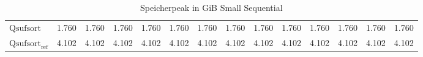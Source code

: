 \begin{table}[h]
{\begin{tabular}{lrrrrrrrrrrrrr}
    $\text{Qsufsort}$ & 1.760 & 1.760 & 1.760 & 1.760 & 1.760 & 1.760 & 1.760 & 1.760 & 1.760 & 1.760 & 1.760 & 1.760 & 1.760 \\
    $\text{Qsufsort}_{\text{ref}}$ & 4.102 & 4.102 & 4.102 & 4.102 & 4.102 & 4.102 & 4.102 & 4.102 & 4.102 & 4.102 & 4.102 & 4.102 & 4.102 \\
\bottomrule
\end{tabular}
}
\caption{Speicherpeak in GiB Small Sequential}
\label{messung:tab:memory-small-seq-none}
\end{table}
